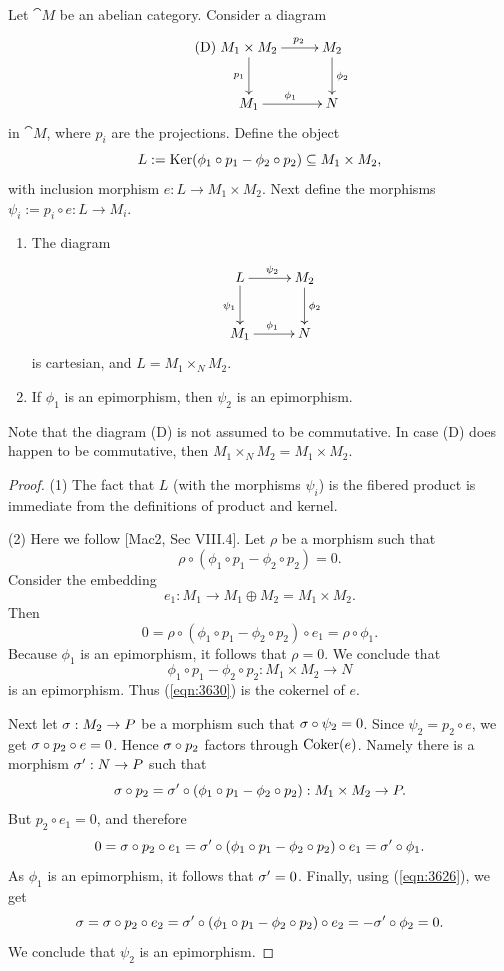\begin{lem} \label{lem:3630}
Let $\cat{M}$ be an abelian category. Consider a diagram 
\[ \tag{D}
\UseTips \xymatrix @C=6ex @R=6ex {
M_1 \times M_2
\ar[r]^(0.6){p_2}
\ar[d]_{p_1}
&
M_2
\ar[d]^{\phi_2}
\\
M_1
\ar[r]^{\phi_1}
&
N
} \]
in $\cat{M}$, where $p_i$ are the projections. 
Define the object 
\[ L := \operatorname{Ker}(\phi_1 \circ p_1 - \phi_2 \circ p_2) \subseteq M_1 \times M_2 , \]
with inclusion morphism 
$e : L \to M_1 \times M_2$.
Next define the morphisms 
$\psi_i := p_i \circ e : L \to M_i$. 
\begin{enumerate}
\item The diagram 
\[ \UseTips \xymatrix @C=6ex @R=6ex {
L
\ar[r]^{\psi_2}
\ar[d]_{\psi_1}
&
M_2
\ar[d]^{\phi_2}
\\
M_1
\ar[r]^{\phi_1}
&
N
} \]
is cartesian, and $L = M_1 \times_N M_2$. 

\item If $\phi_1$ is an epimorphism, then $\psi_2$ is an epimorphism.
\end{enumerate}
\end{lem}

Note that the diagram (D) is not assumed to be commutative. In case (D) does 
happen to be commutative, then 
$M_1 \times_N M_2 = M_1 \times M_2$. 

\begin{proof}
(1) The fact that $L$ (with the morphisms $\psi_i$) is the fibered product is 
immediate from the definitions of product and kernel. 

\medskip \noindent
(2) Here we follow [Mac2, Sec VIII.4]. 
Let $\rho$ be a morphism such that 
\[ \rho \circ (\phi_1 \circ p_1 - \phi_2 \circ p_2) = 0 . \]
Consider the embedding 
\[ e_1 : M_1 \to M_1 \oplus M_2 = M_1 \times M_2 . \]
Then 
\[ 0 = \rho \circ (\phi_1 \circ p_1 - \phi_2 \circ p_2) \circ e_1  
= \rho \circ \phi_1 . \]
Because $\phi_1$ is an epimorphism, it follows that $\rho = 0$. 
We conclude that 
\begin{equation} \label{eqn:3630}
\phi_1 \circ p_1 - \phi_2 \circ p_2 : M_1 \times M_2 \to N
\end{equation}
is an epimorphism. Thus (\ref{eqn:3630}) is the cokernel of $e$. 

Next let $\sigma : M_2 \to P$ be a morphism such that $\sigma \circ \psi_2 = 0$. 
Since $\psi_2 = p_2 \circ e$, we get 
$\sigma \circ p_2 \circ e = 0$. 
Hence $\sigma \circ p_2$ factors through $\operatorname{Coker}(e)$.
Namely there is a morphism $\sigma' : N \to P$ such that 
\begin{equation} \label{eqn:3626}
\sigma \circ p_2 = \sigma' \circ (\phi_1 \circ p_1 - \phi_2 \circ p_2) : 
M_1 \times M_2 \to P . 
\end{equation}
But $p_2 \circ e_1 = 0$, and therefore
\[ 0 = \sigma \circ p_2 \circ e_1 = 
\sigma' \circ (\phi_1 \circ p_1 - \phi_2 \circ p_2) \circ e_1 = 
\sigma' \circ \phi_1 . \]
As $\phi_1$ is an epimorphism, it follows that $\sigma' = 0$. 
Finally, using (\ref{eqn:3626}), we get 
\[ \sigma = \sigma \circ p_2 \circ e_2 = 
\sigma' \circ (\phi_1 \circ p_1 - \phi_2 \circ p_2) \circ e_2 = 
- \sigma' \circ \phi_2 = 0 . \]
We conclude that $\psi_2$ is an epimorphism. 
\end{proof}

